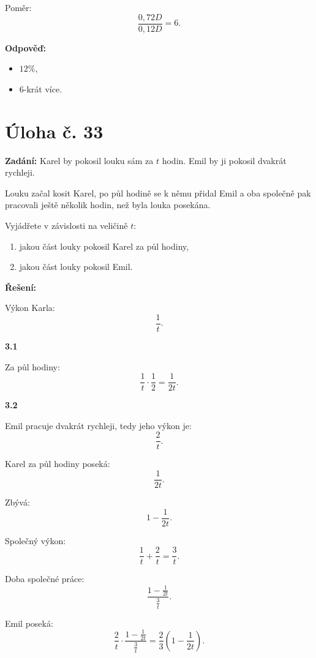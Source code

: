 \documentclass[12pt,a4paper]{article}
\begin{document}
Poměr:
\[
\frac{0{,}72D}{0{,}12D}=6.
\]

\bigskip

\textbf{Odpověď:}
\begin{itemize}
    \item[2.1] \(12\%\),
    \item[2.2] \(6\)-krát více.
\end{itemize}



\newpage
\section*{Úloha č. 33}

\textbf{Zadání:}  
Karel by pokosil louku sám za \(t\) hodin. Emil by ji pokosil dvakrát rychleji.

Louku začal kosit Karel, po půl hodině se k němu přidal Emil a oba společně pak pracovali ještě několik hodin, než byla louka posekána.

Vyjádřete v závislosti na veličině \(t\):

\begin{enumerate}
    \item[3.1] jakou část louky pokosil Karel za půl hodiny,
    \item[3.2] jakou část louky pokosil Emil.
\end{enumerate}

\bigskip

\textbf{Řešení:}

Výkon Karla:
\[
\frac{1}{t}.
\]

\medskip

\textbf{3.1}

Za půl hodiny:
\[
\frac{1}{t}\cdot \frac12 = \frac{1}{2t}.
\]

\medskip

\textbf{3.2}

Emil pracuje dvakrát rychleji, tedy jeho výkon je:
\[
\frac{2}{t}.
\]

Karel za půl hodiny poseká:
\[
\frac{1}{2t}.
\]

Zbývá:
\[
1-\frac{1}{2t}.
\]

Společný výkon:
\[
\frac{1}{t}+\frac{2}{t}=\frac{3}{t}.
\]

Doba společné práce:
\[
\frac{1-\frac{1}{2t}}{\frac{3}{t}}.
\]

Emil poseká:
\[
\frac{2}{t}\cdot \frac{1-\frac{1}{2t}}{\frac{3}{t}}
=\frac{2}{3}\left(1-\frac{1}{2t}\right).
\]
\end{document}
